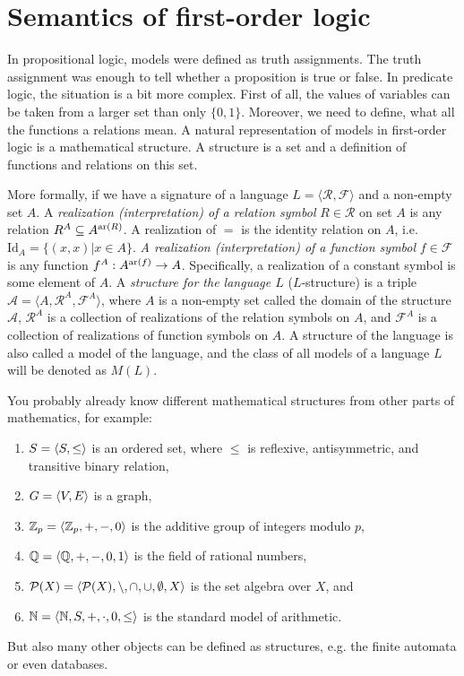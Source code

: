 \section{Semantics of first-order logic}

In propositional logic, models were defined as truth assignments. The truth assignment was enough to tell whether a proposition is true or false. In predicate logic, the situation is a bit more complex. First of all, the values of variables can be taken from a larger set than only $\{0,1\}$. Moreover, we need to define, what all the functions a relations mean. A natural representation of models in first-order logic is a mathematical structure. A structure is a set and a definition of functions and relations on this set. 

More formally, if we have a signature of a language $L = \langle \mathcal{R}, \mathcal{F} \rangle$ and a non-empty set $A$. A \emph{realization (interpretation) of a relation symbol} $R \in \mathcal{R}$ on set $A$ is any relation $R^A \subseteq A^{\operatorname{ar}(R)}$. A realization of $=$ is the identity relation on $A$, i.e. $\mathrm{Id}_A = \{(x, x) | x \in A\}$. \emph{A realization (interpretation) of a function symbol} $f \in \mathcal{F}$ is any function $f^A: A^{\operatorname{ar}(f)} \to A$. Specifically, a realization of a constant symbol is some element of $A$. A \emph{structure for the language $L$} ($L$-structure) is a triple $\mathcal{A} = \langle A, \mathcal{R}^A, \mathcal{F}^A \rangle$, where $A$ is a non-empty set called the domain of the structure $\mathcal{A}$, $\mathcal{R}^A$ is a collection of realizations of the relation symbols on $A$, and $\mathcal{F}^A$ is a collection of realizations of function symbols on $A$. A structure of the language is also called a model of the language, and the class of all models of a language $L$ will be denoted as $M(L)$.

You probably already know different mathematical structures from other parts of mathematics, for example:
\begin{enumerate}
	\item $S = \langle S, \leq \rangle$ is an ordered set, where $\leq$ is reflexive, antisymmetric, and transitive binary relation,
	\item $G = \langle V, E \rangle$ is a graph,
	\item $\mathbb{Z}_p = \langle \mathbb{Z}_p, +, -, 0 \rangle$ is the additive group of integers modulo $p$,
	\item $\mathbb{Q} = \langle \mathbb{Q}, +, -, 0, 1 \rangle$ is the field of rational numbers,
	\item $\mathcal{P}(X) = \langle \mathcal{P}(X), \setminus, \cap, \cup, \emptyset, X \rangle$ is the set algebra over $X$, and
	\item $\mathbb{N} = \langle \mathbb{N}, S, +, \cdot, 0, \leq \rangle$ is the standard model of arithmetic.
\end{enumerate}
But also many other objects can be defined as structures, e.g. the finite automata or even databases.

